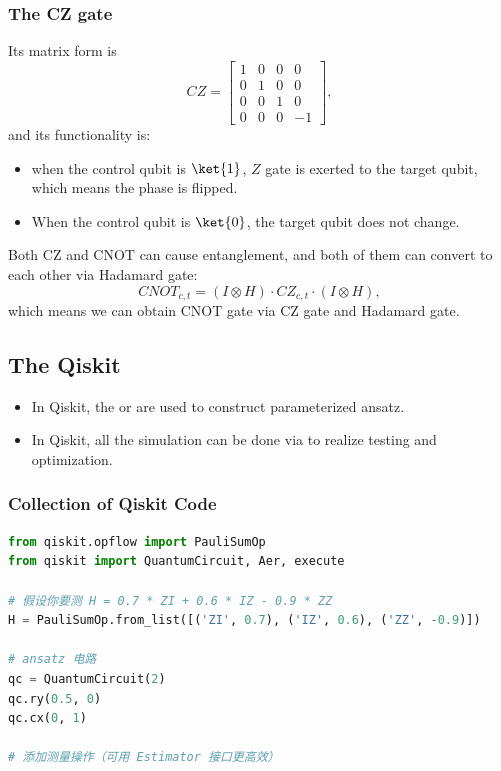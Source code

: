 \subsubsection{The CZ gate}
Its matrix form is
\begin{equation}
    CZ=\begin{bmatrix}
        1&0&0&0\\
        0&1&0&0\\
        0&0&1&0\\
        0&0&0&-1
    \end{bmatrix},
\end{equation}
and its functionality is:
\begin{itemize}
    \item when the control qubit is $\ket{1}$, $Z$ gate is exerted to the target qubit, which means the phase is flipped.
    \item When the control qubit is $\ket{0}$, the target qubit does not change.
\end{itemize}

Both CZ and CNOT can cause entanglement, and both of them can convert to each other via Hadamard gate:
\begin{equation}
    CNOT_{c,t}=(I\otimes H)\cdot CZ_{c,t}\cdot(I\otimes H),
\end{equation}
which means we can obtain CNOT gate via CZ gate and Hadamard gate.


\subsection{The Qiskit}
\begin{itemize}
    \item In Qiskit, the  or  are used to construct parameterized ansatz. 
    \item In Qiskit, all the simulation can be done via  to realize testing and optimization.
\end{itemize}

\subsubsection{Collection of Qiskit Code}
\begin{lstlisting}[language=Python, caption=Circuit Measurement, frame=single, label={lst:CircuitMeasure}]
from qiskit.opflow import PauliSumOp
from qiskit import QuantumCircuit, Aer, execute

# 假设你要测 H = 0.7 * ZI + 0.6 * IZ - 0.9 * ZZ
H = PauliSumOp.from_list([('ZI', 0.7), ('IZ', 0.6), ('ZZ', -0.9)])

# ansatz 电路
qc = QuantumCircuit(2)
qc.ry(0.5, 0)
qc.cx(0, 1)

# 添加测量操作（可用 Estimator 接口更高效）
\end{lstlisting}

